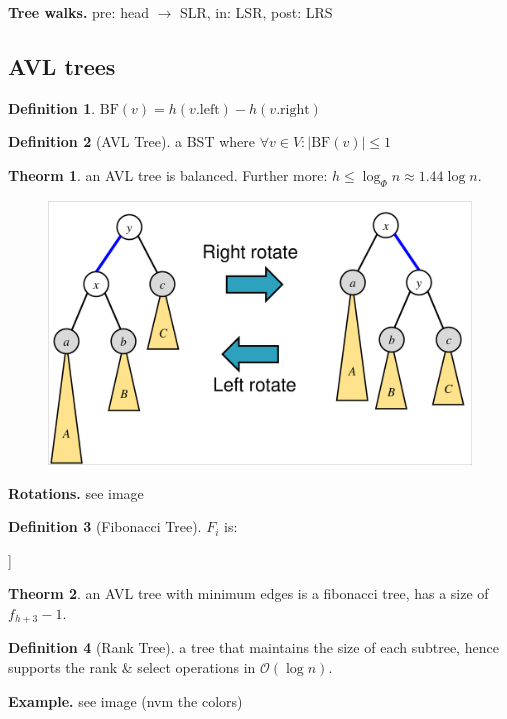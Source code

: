 \documentclass[]{article}
\newcommand\compactsubsection[1]        {\vspace{-10pt}\subsection{#1}\vspace{-6pt}}
\theoremstyle{definition}
\newtheorem{Theorem}{\color{theoColor}Theorm}
\newtheorem{Definition}{\color{defiColor}Definition}
\newcommand\theo  [1] {\begin{Theorem}#1\end{Theorem}}
\newcommand\defi  [1] {\begin{Definition}#1\end{Definition}}
\newcommand\oc    {\mathcal{O}}
\newcommand\co        {\colon}
\newcommand\logn      {\log n}
\newcommand\sof[1]    {\left | #1 \right |}
\begin{document}
\begin{multicols}{4}
				\textbf{Tree walks. }pre: head $\to$ SLR, in: LSR, post: LRS
				
				
			\compactsubsection{AVL trees}
				\defi{$\mathrm{BF}(v) = h(v.\mathrm{left}) - h(v.\mathrm{right})$}
				\begin{Definition}[AVL Tree]
					a BST where $\forall v \in V \co \sof{\mathrm{BF}(v)} \le 1$
				\end{Definition}
				\theo{an AVL tree is balanced. Further more: $h \le \log_{\Phi}n \approx 1.44\logn$. }
				
				\begin{figure}
					\includegraphics[width=\linewidth]{images/rotations}
					\vspace{-20pt}
				\end{figure}
				\textbf{Rotations. }see image
				\begin{Definition}[Fibonacci Tree]
					$F_i$ is: \\ \vspace{3pt} \begin{center}
						\begin{forest}
							[$F_i$ [$F_{i -1}$] [$F_{i - 2}$]]
						\end{forest}
					\end{center}
				\end{Definition}\vspace{2pt}
				\theo{an AVL tree with minimum edges is a fibonacci tree, has a size of $f_{h + 3} - 1$. }
				\begin{Definition}[Rank Tree]
					a tree that maintains the size of each subtree, hence supports the rank \& select operations in $\oc(\logn)$. 
				\end{Definition}
				\textbf{Example. }see image (nvm the colors)

\end{multicols}
\end{document}
